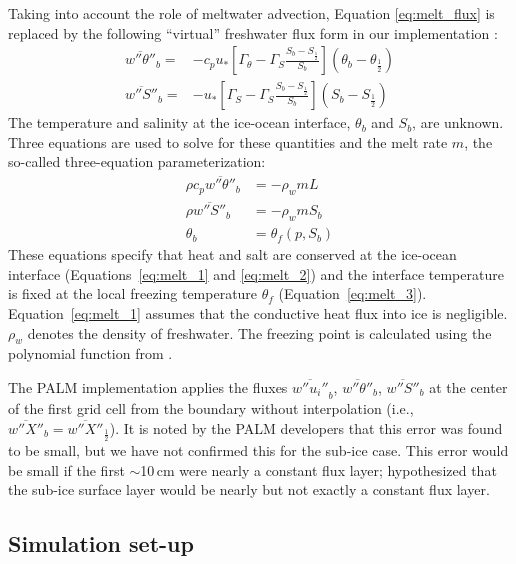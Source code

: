 \documentclass[tc, manuscript]{copernicus}
\begin{document}
Taking into account the role of meltwater advection, Equation \ref{eq:melt_flux} is replaced by the following ``virtual'' freshwater flux form in our implementation \citep{asay-davis_experimental_2016, jenkins_role_2001}:
\begin{align}
    \overline{w''\theta''}_{b} =& -c_p u_*
    \left[\Gamma_{\theta} - \Gamma_S \frac{S_b - S_{\frac{1}{2}}}{S_b}\right]\left(\theta_b-\theta_{\frac{1}{2}}\right) \label{eq:vflux_heat}\\
    \overline{w''S''}_{b} =& -u_*
    \left[\Gamma_S - \Gamma_S \frac{S_b - S_{\frac{1}{2}}}{S_b}\right]\left(S_b-S_{\frac{1}{2}}\right) \label{eq:vflux_salt}
\end{align}
%
The temperature and salinity at the ice-ocean interface, $\theta_b$ and $S_b$, are unknown. Three equations are used to solve for these quantities and the melt rate $m$, the so-called three-equation parameterization:
%
\begin{align}
    \rho c_p \overline{w''\theta''}_{b} &= -\rho_w m L \label{eq:melt_1}\\
    \rho \overline{w''S''}_{b} &= −\rho_w m S_b \label{eq:melt_2}\\
    \theta_b &= \theta_f(p,S_b) \label{eq:melt_3}
\end{align}
%
These equations specify that heat and salt are conserved at the ice-ocean interface (Equations~\ref{eq:melt_1} and \ref{eq:melt_2}) and the interface temperature is fixed at the local freezing temperature $\theta_f$ (Equation~\ref{eq:melt_3}). Equation~\ref{eq:melt_1} assumes that the conductive heat flux into ice is negligible. $\rho_w$ denotes the density of freshwater. The freezing point is calculated using the polynomial function from \citet{jackett_algorithms_2006}.

The PALM implementation applies the fluxes $\overline{w''u_i''}_b$, $\overline{w''\theta''}_b$, $\overline{w''S''}_b$ at the center of the first grid cell from the boundary without interpolation (i.e., $\overline{w''X''}_b = \overline{w''X''}_{\frac{1}{2}}$). It is noted by the PALM developers that this error was found to be small, but we have not confirmed this for the sub-ice case. This error would be small if the first $\sim$10\,\unit{cm} were nearly a constant flux layer; \citet{mcphee_analytic_1981} hypothesized that the sub-ice surface layer would be nearly but not exactly a constant flux layer. 


\subsection{Simulation set-up}\label{meth:setup}
\end{document}
